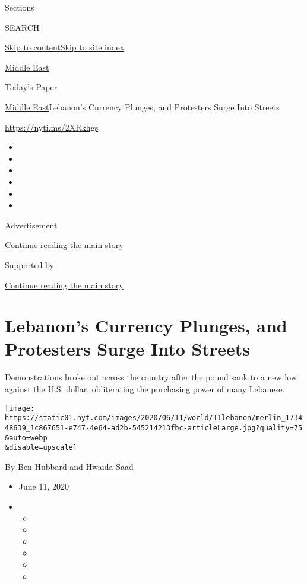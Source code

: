 Sections

SEARCH

\protect\hyperlink{site-content}{Skip to
content}\protect\hyperlink{site-index}{Skip to site index}

\href{https://www.nytimes.com/section/world/middleeast}{Middle East}

\href{https://myaccount.nytimes.com/auth/login?response_type=cookie\&client_id=vi}{}

\href{https://www.nytimes.com/section/todayspaper}{Today's Paper}

\href{/section/world/middleeast}{Middle East}\textbar{}Lebanon's
Currency Plunges, and Protesters Surge Into Streets

\url{https://nyti.ms/2XRkhgs}

\begin{itemize}
\item
\item
\item
\item
\item
\item
\end{itemize}

Advertisement

\protect\hyperlink{after-top}{Continue reading the main story}

Supported by

\protect\hyperlink{after-sponsor}{Continue reading the main story}

\hypertarget{lebanons-currency-plunges-and-protesters-surge-into-streets}{%
\section{Lebanon's Currency Plunges, and Protesters Surge Into
Streets}\label{lebanons-currency-plunges-and-protesters-surge-into-streets}}

Demonstrations broke out across the country after the pound sank to a
new low against the U.S. dollar, obliterating the purchasing power of
many Lebanese.

\texttt{[image: https://static01.nyt.com/images/2020/06/11/world/11lebanon/merlin\_173448639\_1c867651-e747-4e64-ad2b-545214213fbc-articleLarge.jpg?quality=75\\\&auto=webp\\\&disable=upscale]}

By \href{https://www.nytimes.com/by/ben-hubbard}{Ben Hubbard} and
\href{https://www.nytimes.com/by/hwaida-saad}{Hwaida Saad}

\begin{itemize}
\item
  June 11, 2020
\item
  \begin{itemize}
  \item
  \item
  \item
  \item
  \item
  \item
  \end{itemize}
\end{itemize}

